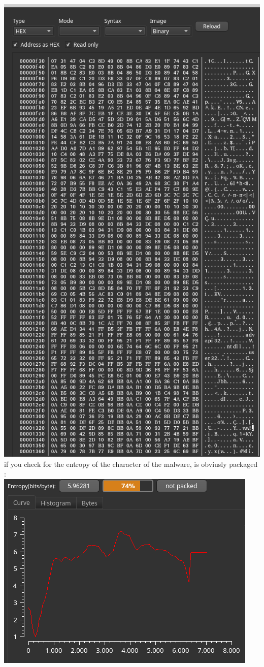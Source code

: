 \documentclass[10pt,a4paper]{article} %
\begin{document}
        \\ \includegraphics[width=0.8\linewidth]{memorydump.png}
        \\
        if you check for the entropy of the character of the malware, is obviusly packaged :
        \\ \includegraphics[width=0.8\linewidth]{compression_entropy.png}
\end{document}
